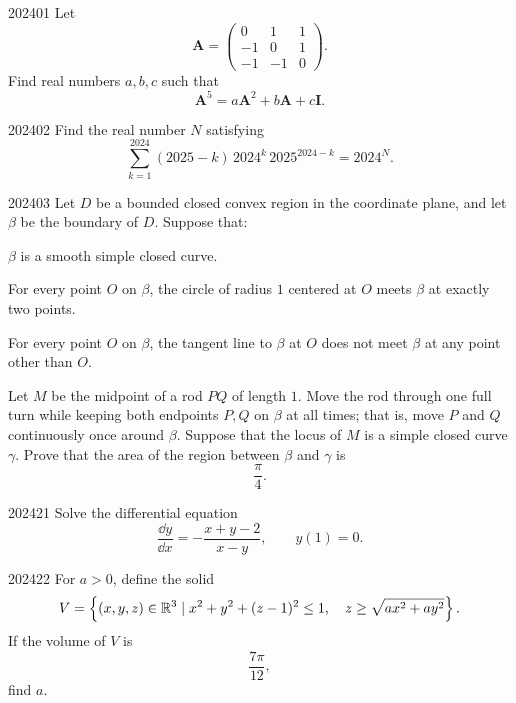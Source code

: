 
\begin{problem}{2024}{0}{1}
Let
\[
    \mathbf A=
    \begin{pmatrix}
        0&1&1\\
        -1&0&1\\
        -1&-1&0
    \end{pmatrix}.
\]
Find real numbers $a, b, c$ such that
\[
    \mathbf A^5=a\mathbf A^2+b\mathbf A+c\mathbf I.
\]
\end{problem}

\begin{problem}{2024}{0}{2}
Find the real number $N$ satisfying
\[
    \sum_{k=1}^{2024}
    (2025-k)\, 2024^k\, 2025^{2024-k}
    =2024^N.
\]
\end{problem}

\begin{problem}{2024}{0}{3}
Let $D$ be a bounded closed convex region in the coordinate plane, and let $\beta$ be the boundary of $D$. Suppose that:
\begin{problemclauses}
    \item $\beta$ is a smooth simple closed curve.
    \item For every point $O$ on $\beta$, the circle of radius $1$ centered at $O$ meets $\beta$ at exactly two points.
    \item For every point $O$ on $\beta$, the tangent line to $\beta$ at $O$ does not meet $\beta$ at any point other than $O$.
\end{problemclauses}
Let $M$ be the midpoint of a rod $PQ$ of length $1$. Move the rod through one full turn while keeping both endpoints $P, Q$ on $\beta$ at all times; that is, move $P$ and $Q$ continuously once around $\beta$. Suppose that the locus of $M$ is a simple closed curve $\gamma$. Prove that the area of the region between $\beta$ and $\gamma$ is
\[
    \frac\pi4.
\]
\end{problem}

\begin{problem}{2024}{2}{1}
Solve the differential equation
\[
    \frac{\dd y}{\dd x}
    =-\frac{x+y-2}{x-y},
    \qquad
    y(1)=0.
\]
\end{problem}

\begin{problem}{2024}{2}{2}
For $a>0$, define the solid
\[
    V=
    \left\{
        (x, y, z)\in\mathbb{R}^3\mid
        x^2+y^2+(z-1)^2\le1,
        \quad
        z\ge\sqrt{ax^2+ay^2}
    \right\}.
\]
If the volume of $V$ is
\[
    \frac{7\pi}{12},
\]
find $a$.
\end{problem}


